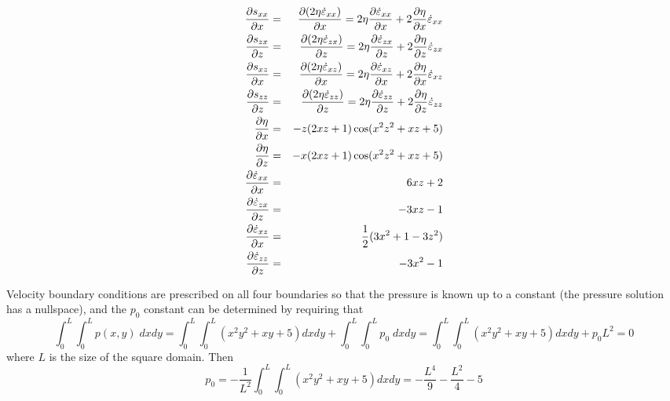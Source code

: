 \begin{eqnarray}
\frac{\partial s_{xx}}{\partial x} 
&=& \frac{\partial (2 \eta \dot{\varepsilon}_{xx}) }{\partial x} = 2 \eta \frac{\partial  \dot{\varepsilon}_{xx} }{\partial x} +  2\frac{\partial \eta }{\partial x} \dot{\varepsilon}_{xx} \nonumber\\
\frac{\partial s_{zx}}{\partial z} 
&=& \frac{\partial (2 \eta \dot{\varepsilon}_{zx}) }{\partial z} = 2 \eta \frac{\partial  \dot{\varepsilon}_{zx} }{\partial z} +  2\frac{\partial \eta }{\partial z} \dot{\varepsilon}_{zx} \nonumber\\
\frac{\partial s_{xz}}{\partial x} 
&=& \frac{\partial (2 \eta \dot{\varepsilon}_{xz}) }{\partial x} = 2 \eta \frac{\partial  \dot{\varepsilon}_{xz} }{\partial x} +  2\frac{\partial \eta }{\partial x} \dot{\varepsilon}_{xz} \nonumber\\
\frac{\partial s_{zz}}{\partial z} 
&=& \frac{\partial (2 \eta \dot{\varepsilon}_{zz}) }{\partial z} = 2 \eta \frac{\partial  \dot{\varepsilon}_{zz} }{\partial z} +  2\frac{\partial \eta }{\partial z} \dot{\varepsilon}_{zz} \nonumber\\
\frac{\partial \eta }{\partial x} &=& -z (2 x z + 1) \cos(x^2 z^2 + x z + 5) \nonumber\\
\frac{\partial \eta }{\partial z} &=& -x (2 x z + 1) \cos(x^2 z^2 + x z + 5) \nonumber\\
\frac{\partial  \dot{\varepsilon}_{xx} }{\partial x} &=& 6xz+2 \nonumber\\
\frac{\partial  \dot{\varepsilon}_{zx} }{\partial z} &=& -3xz-1  \nonumber\\
\frac{\partial  \dot{\varepsilon}_{xz} }{\partial x} &=& \frac{1}{2}(3x^2+1-3z^2)  \nonumber\\
\frac{\partial  \dot{\varepsilon}_{zz} }{\partial z} &=& -3x^2-1  \nonumber
\end{eqnarray}

Velocity boundary conditions are prescribed on all four boundaries so that the pressure is known up to a constant
(the pressure solution has a nullspace), 
and the $p_0$ constant can be determined by requiring that
\[
\int_0^L\int_0^L p(x,y) \; dx dy = 
\int_0^L\int_0^L (x^2y^2+xy+5) dx dy + \int_0^L \int_0^L p_0 \; dxdy = 
\int_0^L\int_0^L (x^2y^2+xy+5) dx dy + p_0 L^2 =0 
\]
where $L$ is the size of the square domain.
Then
\[
p_0 =-  \frac{1}{L^2}  \int_0^L\int_0^L (x^2y^2+xy+5) dx dy
= -\frac{L^4}{9}-\frac{L^2}{4} - 5 
\]
\[
\]

